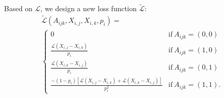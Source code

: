 \documentclass[conference]{IEEEtran}
\numberwithin{equation}{section}
\newcommand{\R}{\mathbb{R}}
\newtheorem{lemma}{Lemma}
\newtheorem{sampling strategy}{Sampling Strategy}
\begin{document}
Based on $\mathcal{L}$, we design a new loss function $\tilde{\mathcal{L}}$:
\begin{equation}
    \begin{aligned}
        & \tilde{\mathcal{L}}(A_{ijk}, X_{i,j}, X_{i,k}, p_i) = & \\
        & \begin{cases}
             0 & \text{if}~ A_{ijk} = (0,0) \\
             \frac{ \mathcal{L}(X_{i,j} - X_{i,k})  }{p_i} &  \text{if}~ A_{ijk} = (1,0) \\
             \frac{ \mathcal{L}(X_{i,k} - X_{i,j})  }{p_i} &  \text{if}~ A_{ijk} = (0,1) \\
             \frac{ -(1-p_i)[\mathcal{L}(X_{i,j} - X_{i,k}) + \mathcal{L}(X_{i,k} - X_{i,j})  ] }{p_i^2} &  \text{if}~ A_{ijk} = (1,1).
        \end{cases}
    \end{aligned}
    \label{eq:modifiedloss}
\end{equation}


\end{document}
